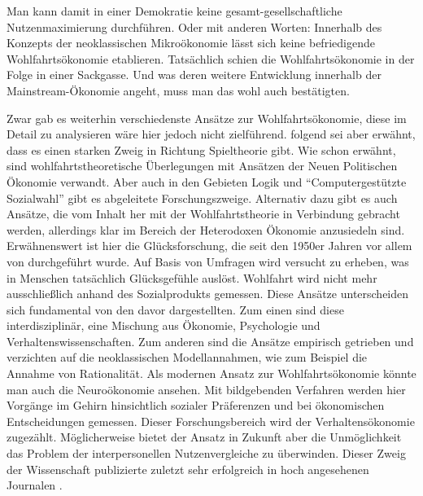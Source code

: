 Man kann damit in einer Demokratie keine gesamt-gesellschaftliche Nutzenmaximierung durchführen. Oder mit anderen Worten: Innerhalb des Konzepts der neoklassischen Mikroökonomie lässt sich keine befriedigende Wohlfahrtsökonomie etablieren. Tatsächlich schien die Wohlfahrtsökonomie in der Folge in einer Sackgasse. Und was deren weitere Entwicklung innerhalb der Mainstream-Ökonomie angeht, muss man das wohl auch bestätigten. 

Zwar gab es weiterhin verschiedenste Ansätze zur Wohlfahrtsökonomie, diese im Detail zu analysieren wäre hier jedoch nicht zielführend. \textcite{Fleurbaey2021} folgend sei aber erwähnt, dass es einen starken Zweig in Richtung Spieltheorie gibt. Wie schon erwähnt, sind wohlfahrtstheoretische Überlegungen mit Ansätzen der Neuen Politischen Ökonomie verwandt. Aber auch in den Gebieten Logik und "`Computergestützte Sozialwahl"' gibt es abgeleitete Forschungszweige. Alternativ dazu gibt es auch Ansätze, die vom Inhalt her mit der Wohlfahrtstheorie in Verbindung gebracht werden, allerdings klar im Bereich der Heterodoxen Ökonomie anzusiedeln sind. Erwähnenswert ist hier die Glücksforschung, die seit den 1950er Jahren vor allem von \textcite{Easterlin1974} durchgeführt wurde. Auf Basis von Umfragen wird versucht zu erheben, was in Menschen tatsächlich Glücksgefühle auslöst. Wohlfahrt wird nicht mehr ausschließlich anhand des Sozialprodukts gemessen. Diese Ansätze unterscheiden sich fundamental von den davor dargestellten. Zum einen sind diese interdisziplinär, eine Mischung aus Ökonomie, Psychologie und Verhaltenswissenschaften. Zum anderen sind die Ansätze empirisch getrieben und verzichten auf die neoklassischen Modellannahmen, wie zum Beispiel die Annahme von Rationalität. Als modernen Ansatz zur Wohlfahrtsökonomie könnte man auch die Neuroökonomie ansehen. Mit bildgebenden Verfahren werden hier Vorgänge im Gehirn hinsichtlich sozialer Präferenzen und bei ökonomischen Entscheidungen gemessen. Dieser Forschungsbereich wird der Verhaltensökonomie zugezählt. Möglicherweise bietet der Ansatz in Zukunft aber die Unmöglichkeit das Problem der interpersonellen Nutzenvergleiche zu überwinden. Dieser Zweig der Wissenschaft publizierte zuletzt sehr erfolgreich in hoch angesehenen Journalen \parencite{Fehr2000, Fehr2003}.

